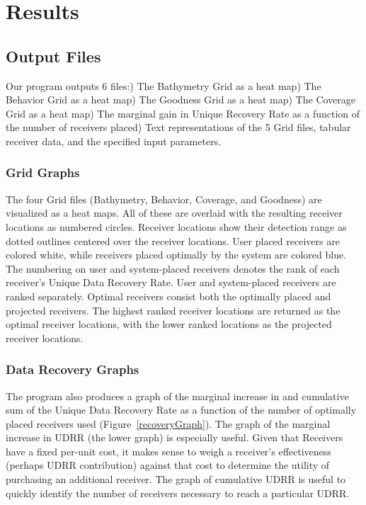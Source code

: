 \chapter{Results}
\section{Output Files}
Our program outputs 6 files:) The Bathymetry Grid as a heat map) The Behavior Grid as a heat map) The Goodness Grid as a heat map) The Coverage Grid as a heat map) The marginal gain in Unique Recovery Rate as a function of the number of receivers placed) Text representations of the 5 Grid files, tabular receiver data, and the specified input parameters.\newline

\subsection{Grid Graphs}
The four Grid files (Bathymetry, Behavior, Coverage, and Goodness) are visualized as a heat maps.  All of these are overlaid with the resulting receiver locations as numbered circles.  Receiver locations show their detection range as dotted outlines centered over the receiver locations.  User placed receivers are colored white, while receivers placed optimally by the system are colored blue.  The numbering on user and system-placed receivers denotes the rank of each receiver's Unique Data Recovery Rate.  User and system-placed receivers are ranked separately.  Optimal receivers consist both the optimally placed and projected receivers.  The highest ranked receiver locations are returned as the optimal receiver locations, with the lower ranked locations as the projected receiver locations.


\subsection{Data Recovery Graphs}
The program also produces a graph of the marginal increase in and cumulative sum of the Unique Data Recovery Rate as a function of the number of optimally placed receivers used (Figure~\ref{recoveryGraph}).  The graph of the marginal increase in UDRR (the lower graph) is especially useful.  Given that Receivers have a fixed per-unit cost, it makes sense to weigh a receiver's effectiveness (perhaps UDRR contribution) against that cost to determine the utility of purchasing an additional receiver.  The graph of cumulative UDRR is useful to quickly identify the number of receivers necessary to reach a particular UDRR.

